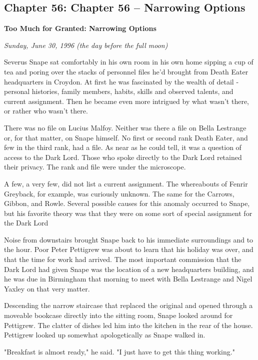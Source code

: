 \documentclass[a4paper,11pt]{article}
\begin{document}
\subsection{Chapter 56: Chapter 56 – Narrowing Options}

\textbf{Too Much for Granted: Narrowing Options}

\emph{Sunday, June 30, 1996 (the day before the full moon)}

Severus Snape sat comfortably in his own room in his own home sipping a cup of tea and poring over the stacks of personnel files he'd brought from Death Eater headquarters in Croydon. At first he was fascinated by the wealth of detail - personal histories, family members, habits, skills and observed talents, and current assignment. Then he became even more intrigued by what wasn't there, or rather who wasn't there.

There was no file on Lucius Malfoy. Neither was there a file on Bella Lestrange or, for that matter, on Snape himself. No first or second rank Death Eater, and few in the third rank, had a file. As near as he could tell, it was a question of access to the Dark Lord. Those who spoke directly to the Dark Lord retained their privacy. The rank and file were under the microscope.

A few, a very few, did not list a current assignment. The whereabouts of Fenrir Greyback, for example, was curiously unknown. The same for the Carrows, Gibbon, and Rowle. Several possible causes for this anomaly occurred to Snape, but his favorite theory was that they were on some sort of special assignment for the Dark Lord

Noise from downstairs brought Snape back to his immediate surroundings and to the hour. Poor Peter Pettigrew was about to learn that his holiday was over, and that the time for work had arrived. The most important commission that the Dark Lord had given Snape was the location of a new headquarters building, and he was due in Birmingham that morning to meet with Bella Lestrange and Nigel Yaxley on that very matter.

Descending the narrow staircase that replaced the original and opened through a moveable bookcase directly into the sitting room, Snape looked around for Pettigrew. The clatter of dishes led him into the kitchen in the rear of the house. Pettigrew looked up somewhat apologetically as Snape walked in.

"Breakfast is almost ready," he said. "I just have to get this thing working."
\end{document}
